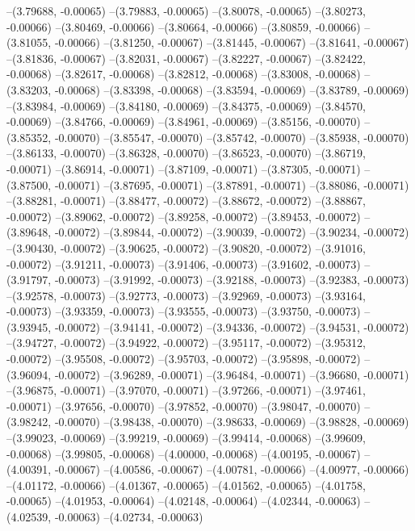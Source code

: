 --(3.79688, -0.00065)
--(3.79883, -0.00065)
--(3.80078, -0.00065)
--(3.80273, -0.00066)
--(3.80469, -0.00066)
--(3.80664, -0.00066)
--(3.80859, -0.00066)
--(3.81055, -0.00066)
--(3.81250, -0.00067)
--(3.81445, -0.00067)
--(3.81641, -0.00067)
--(3.81836, -0.00067)
--(3.82031, -0.00067)
--(3.82227, -0.00067)
--(3.82422, -0.00068)
--(3.82617, -0.00068)
--(3.82812, -0.00068)
--(3.83008, -0.00068)
--(3.83203, -0.00068)
--(3.83398, -0.00068)
--(3.83594, -0.00069)
--(3.83789, -0.00069)
--(3.83984, -0.00069)
--(3.84180, -0.00069)
--(3.84375, -0.00069)
--(3.84570, -0.00069)
--(3.84766, -0.00069)
--(3.84961, -0.00069)
--(3.85156, -0.00070)
--(3.85352, -0.00070)
--(3.85547, -0.00070)
--(3.85742, -0.00070)
--(3.85938, -0.00070)
--(3.86133, -0.00070)
--(3.86328, -0.00070)
--(3.86523, -0.00070)
--(3.86719, -0.00071)
--(3.86914, -0.00071)
--(3.87109, -0.00071)
--(3.87305, -0.00071)
--(3.87500, -0.00071)
--(3.87695, -0.00071)
--(3.87891, -0.00071)
--(3.88086, -0.00071)
--(3.88281, -0.00071)
--(3.88477, -0.00072)
--(3.88672, -0.00072)
--(3.88867, -0.00072)
--(3.89062, -0.00072)
--(3.89258, -0.00072)
--(3.89453, -0.00072)
--(3.89648, -0.00072)
--(3.89844, -0.00072)
--(3.90039, -0.00072)
--(3.90234, -0.00072)
--(3.90430, -0.00072)
--(3.90625, -0.00072)
--(3.90820, -0.00072)
--(3.91016, -0.00072)
--(3.91211, -0.00073)
--(3.91406, -0.00073)
--(3.91602, -0.00073)
--(3.91797, -0.00073)
--(3.91992, -0.00073)
--(3.92188, -0.00073)
--(3.92383, -0.00073)
--(3.92578, -0.00073)
--(3.92773, -0.00073)
--(3.92969, -0.00073)
--(3.93164, -0.00073)
--(3.93359, -0.00073)
--(3.93555, -0.00073)
--(3.93750, -0.00073)
--(3.93945, -0.00072)
--(3.94141, -0.00072)
--(3.94336, -0.00072)
--(3.94531, -0.00072)
--(3.94727, -0.00072)
--(3.94922, -0.00072)
--(3.95117, -0.00072)
--(3.95312, -0.00072)
--(3.95508, -0.00072)
--(3.95703, -0.00072)
--(3.95898, -0.00072)
--(3.96094, -0.00072)
--(3.96289, -0.00071)
--(3.96484, -0.00071)
--(3.96680, -0.00071)
--(3.96875, -0.00071)
--(3.97070, -0.00071)
--(3.97266, -0.00071)
--(3.97461, -0.00071)
--(3.97656, -0.00070)
--(3.97852, -0.00070)
--(3.98047, -0.00070)
--(3.98242, -0.00070)
--(3.98438, -0.00070)
--(3.98633, -0.00069)
--(3.98828, -0.00069)
--(3.99023, -0.00069)
--(3.99219, -0.00069)
--(3.99414, -0.00068)
--(3.99609, -0.00068)
--(3.99805, -0.00068)
--(4.00000, -0.00068)
--(4.00195, -0.00067)
--(4.00391, -0.00067)
--(4.00586, -0.00067)
--(4.00781, -0.00066)
--(4.00977, -0.00066)
--(4.01172, -0.00066)
--(4.01367, -0.00065)
--(4.01562, -0.00065)
--(4.01758, -0.00065)
--(4.01953, -0.00064)
--(4.02148, -0.00064)
--(4.02344, -0.00063)
--(4.02539, -0.00063)
--(4.02734, -0.00063)
